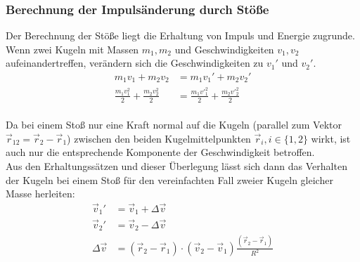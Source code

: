 \subsubsection{Berechnung der Impulsänderung durch Stöße}
Der Berechnung der Stöße liegt die Erhaltung von Impuls und Energie zugrunde. Wenn zwei Kugeln mit Massen $m_1,m_2$ und Geschwindigkeiten $v_1,v_2$ aufeinandertreffen, verändern sich die Geschwindigkeiten zu $v_1'$ und $v_2'$.
\begin{align*}
m_1v_1 + m_2v_2 &= m_1v_1'+m_2v_2'\\
\frac{m_1v^2_1}{2} + \frac{m_2v^2_2}{2} &= \frac{m_1v'^2_1}{2} + \frac{m_2v'^2_2}{2}
\end{align*}
\\
Da bei einem Stoß nur eine Kraft normal auf die Kugeln (parallel zum Vektor $\vec r_{12} = \vec r_2 - \vec r_1$) zwischen den beiden Kugelmittelpunkten $\vec r_i, i\in \{1,2\}$ wirkt, ist auch nur die entsprechende Komponente der Geschwindigkeit betroffen.\\
Aus den Erhaltungssätzen und dieser Überlegung lässt sich dann das Verhalten der Kugeln bei einem Stoß für den vereinfachten Fall zweier Kugeln gleicher Masse herleiten:
\begin{align*}
\vec v_1' &= \vec v_1 + \Delta \vec v\\
\vec v_2'& = \vec v_2 - \Delta \vec v\\
\Delta\vec v &= \left(\vec r_2 - \vec r_1\right) \cdot \left(\vec v_2 - \vec v_1\right)\frac{\left(\vec r_2 - \vec r_1\right)}{R^2}
\end{align*}

